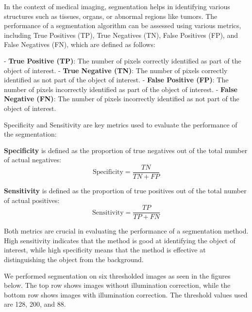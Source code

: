 \documentclass[%
	a4paper, %
	12pt, %
	english, %
	bibtotoc %
]{scrartcl}
\begin{document}
In the context of medical imaging, segmentation helps in identifying various structures such as tissues, organs, or abnormal regions like tumors. The performance of a segmentation algorithm can be assessed using various metrics, including True Positives (TP), True Negatives (TN), False Positives (FP), and False Negatives (FN), which are defined as follows:

- \textbf{True Positive (TP)}: The number of pixels correctly identified as part of the object of interest.
- \textbf{True Negative (TN)}: The number of pixels correctly identified as not part of the object of interest.
- \textbf{False Positive (FP)}: The number of pixels incorrectly identified as part of the object of interest.
- \textbf{False Negative (FN)}: The number of pixels incorrectly identified as not part of the object of interest.

Specificity and Sensitivity are key metrics used to evaluate the performance of the segmentation:

\textbf{Specificity} is defined as the proportion of true negatives out of the total number of actual negatives:
\begin{equation}
    \text{Specificity} = \frac{TN}{TN + FP}
\end{equation}

\textbf{Sensitivity} is defined as the proportion of true positives out of the total number of actual positives:
\begin{equation}
    \text{Sensitivity} = \frac{TP}{TP + FN}
\end{equation}

Both metrics are crucial in evaluating the performance of a segmentation method. High sensitivity indicates that the method is good at identifying the object of interest, while high specificity means that the method is effective at distinguishing the object from the background.

We performed segmentation on six thresholded images as seen in the figures below. The top row shows images without illumination correction, while the bottom row shows images with illumination correction. The threshold values used are 128, 200, and 88.
\end{document}
